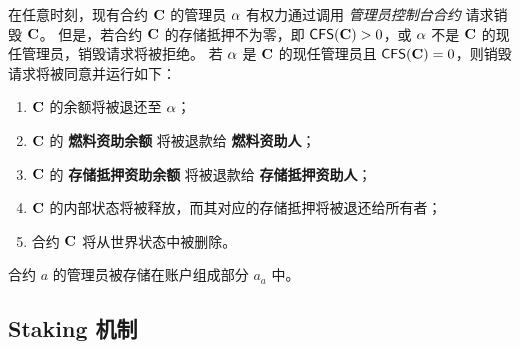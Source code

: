 在任意时刻，现有合约 $\mathbf{C}$ 的管理员 $\mathbf{\alpha}$ 有权力通过调用 \emph{管理员控制台合约} 请求销毁 $\mathbf{C}$。
但是，若合约 $\mathbf{C}$ 的存储抵押不为零，即 $\mathsf{CFS}(\mathbf{C})>0$，或 $\mathbf{\alpha}$ 不是 $\mathbf{C}$ 的现任管理员，销毁请求将被拒绝。
若 $\mathbf{\alpha}$ 是 $\mathbf{C}$ 的现任管理员且 $\mathsf{CFS}(\mathbf{C})=0$，则销毁请求将被同意并运行如下：
\begin{enumerate}[nosep]
 	\item $\mathbf{C}$ 的余额将被退还至 $\mathbf{\alpha}$；

	\item $\mathbf{C}$ 的 \textbf{燃料资助余额} 将被退款给 \textbf{燃料资助人}；

	\item $\mathbf{C}$ 的 \textbf{存储抵押资助余额} 将被退款给 \textbf{存储抵押资助人}；

	\item $\mathbf{C}$ 的内部状态将被释放，而其对应的存储抵押将被退还给所有者；

	\item 合约 $\mathbf{C}$ 将从世界状态中被删除。
\end{enumerate} 

合约 $a$ 的管理员被存储在账户组成部分 $a_a$ 中。

\subsection{Staking 机制}
\label{sec:staking}

